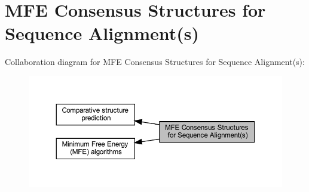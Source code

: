\hypertarget{group__consensus__mfe__fold}{}\section{M\+FE Consensus Structures for Sequence Alignment(s)}
\label{group__consensus__mfe__fold}
Collaboration diagram for M\+FE Consensus Structures for Sequence Alignment(s)\+:
\nopagebreak
\begin{figure}[H]
\begin{center}
\leavevmode
\includegraphics[width=350pt]{group__consensus__mfe__fold}
\end{center}
\end{figure}
